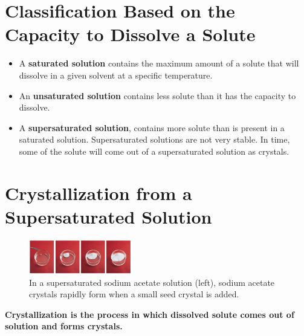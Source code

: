 \documentclass[a4paper,12pt,twocolumn]{article}
\begin{document}
\section{Classification Based on the Capacity to Dissolve a Solute}
\begin{itemize}
\item A \textbf{saturated solution} contains the maximum amount of a solute that will dissolve in a given solvent at a specific temperature. 
\item An \textbf{unsaturated solution} contains less solute than it has the capacity to dissolve. 
\item A \textbf{supersaturated solution}, contains more solute than is present in a saturated solution. Supersaturated solutions are not very stable. In time, some of the solute will come out of a supersaturated solution as crystals.
\end{itemize}

\section{Crystallization from a Supersaturated Solution}

\begin{figure}[h]
\centering
\includegraphics[width=0.4\textwidth]{Screenshot 2023-03-23 120914.png}
\caption{In a supersaturated sodium acetate solution (left), sodium acetate crystals rapidly form when a small seed crystal is added.}
\end{figure}


\begin{Box1}{}
\textbf{Crystallization is the process in which dissolved solute comes out of solution and forms crystals.}
\end{Box1}
\end{document}
